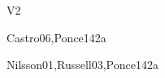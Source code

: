 \begin{syllabus}
\begin{competences}{V2}
    \item {} 
    \item {}
    \item {}
\end{competences}

\begin{unit}{\ISFundamentalIssues}{}{Castro06,Ponce14}{2}{a}
    \begin{topics}
        \item \ISFundamentalIssuesTopicOverview
        \item \ISFundamentalIssuesTopicWhat
        \item \ISFundamentalIssuesTopicProblem
        \item \ISFundamentalIssuesTopicNature
        \item \ISFundamentalIssuesTopicPhilosophical
    \end{topics}
    \begin{learningoutcomes}
        \item \ISFundamentalIssuesLODescribeTuring [\Usage]
        \item \ISFundamentalIssuesLODeterming [\Usage]
    \end{learningoutcomes}
\end{unit}

\begin{unit}{\ISAgents}{}{Nilsson01,Russell03,Ponce14}{2}{a}
\begin{topics}
    \item \ISAgentsTopicDefinitions
    \item \ISAgentsTopicAgent
    \item \ISAgentsTopicAgentTheory
    \item \ISAgentsTopicRationality
    \item \ISAgentsTopicSoftware
    \item \ISAgentsTopicLearning
    \item \ISAgentsTopicMulti
\end{topics}
\begin{learningoutcomes}
    \item \ISAgentsLOListTheOf [\Usage]
    \item \ISAgentsLOCharacterizeAnd [\Usage]
    \item \ISAgentsLODescribeTheAgent [\Usage]
    \item \ISAgentsLODescribeTheUsed [\Usage]
    \item \ISAgentsLODemonstrateUsingHow [\Usage]
\end{learningoutcomes}
\end{unit}


\end{syllabus}
